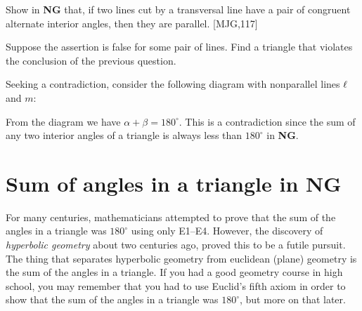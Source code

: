 \documentclass{ximera}
\begin{document}
\begin{question}
Show in \textbf{NG} that, if two lines cut by a transversal line have
a pair of congruent alternate interior angles, then they are
parallel. [MJG,117]
\begin{solution}
\begin{hint}
Suppose the assertion is false for some pair of lines. Find a triangle
that violates the conclusion of the previous question.
\end{hint}
\begin{freeResponse}
Seeking a contradiction, consider the following diagram with
nonparallel lines $\ell$ and $m$:
\begin{image}
\end{image}
From the diagram we have $\alpha + \beta = 180^\circ$. This is a
contradiction since the sum of any two interior angles of a triangle
is always less than $180^\circ$ in \textbf{NG}.
\end{freeResponse}
\end{solution}
\end{question}







\section*{Sum of angles in a triangle in NG}


For many centuries, mathematicians attempted to prove that the sum of
the angles in a triangle was $180^{\circ}$ using only E1--E4. However,
the discovery of \textit{hyperbolic geometry} about two centuries ago,
proved this to be a futile pursuit. The thing that separates
hyperbolic geometry from euclidean (plane) geometry is the sum of the
angles in a triangle. If you had a good geometry course in high
school, you may remember that you had to use Euclid's fifth axiom in
order to show that the sum of the angles in a triangle was
$180^{\circ}$, but more on that later.
\end{document}
